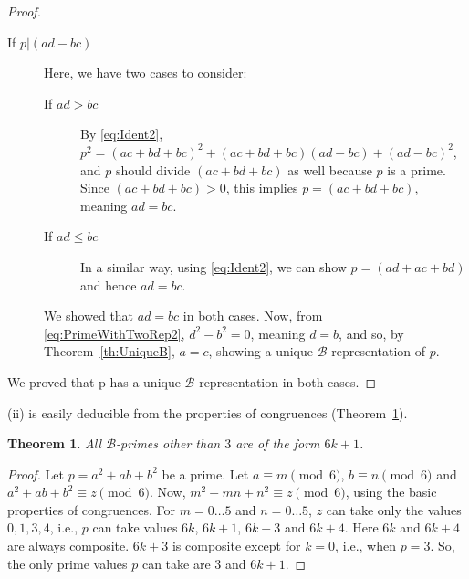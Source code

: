 \documentclass[reqno]{amsart}
\newtheorem{theorem}{Theorem}
\newcommand{\bprime} {\ensuremath{\mathcal B}-prime}
\newcommand{\brep}   {\ensuremath{\mathcal B}-representation}
\newcommand{\congr}[3]{{\ensuremath{{#1} \equiv {#2}
      \pmod{#3}}}}
\newcommand{\bq}[2]{\ensuremath{{#1}^2 + {#1}{#2} + {#2}^2}}
\newcommand{\bqab}{\bq{a}{b}}
\begin{document}
\begin{proof}
\begin{description}
  \item [If \boldmath$p|(ad-bc)$\unboldmath] Here, we have two cases to consider:
    \begin{description}
    \item [If \boldmath$ad > bc$\unboldmath] By \eqref{eq:Ident2}, $p^2 =
      \bq{(ac+bd+bc)}{(ad-bc)}$, and $p$ should divide
      $(ac+bd+bc)$ as well because $p$ is a prime.  Since
      $(ac+bd+bc) > 0$, this implies $p=(ac+bd+bc)$, meaning
      $ad=bc$.  
    \item [If \boldmath$ad \le bc$\unboldmath] In a similar way, using \eqref{eq:Ident2}, we can show $p =
      (ad+ac+bd)$ and hence $ad = bc$.  
    \end{description}
    We showed that $ad=bc$ in both cases.  Now, from
    \eqref{eq:PrimeWithTwoRep2}, $d^2-b^2 = 0$, meaning $d=b$,
    and so, by Theorem~\ref{th:UniqueB}, $a=c$, showing a unique \brep{} of $p$.
  \end{description}
  We proved that p has a unique \brep{} in both cases.
\end{proof}

(ii) is easily deducible from the properties of
congruences (Theorem~\ref{th:Basic}). 

\begin{theorem}
  \label{th:Basic}
  All \bprime{}s other than $3$ are of the form $6k+1$.
\end{theorem}
\begin{proof}
  Let $p = a^2 + ab + b^2$ be a prime.  
  Let \congr{a}{m}{6}, \congr{b}{n}{6} and
  \congr{\bqab}{z}{6}. Now, 
  \congr{\bq{m}{n}}{z}{6}, using the basic properties
  of congruences.
  For $m = 0 \ldots 5$ and $n = 0 \ldots 5$, $z$ can take
  only the values $0, 1, 3, 4$, i.e., $p$ can take values
  $6k$, $6k+1$, $6k+3$ and $6k+4$.  Here $6k$ and $6k+4$ are
  always composite.  $6k+3$ is composite except for $k
  = 0$, i.e., when $p = 3$.  So, the only prime values $p$ can
  take are $3$ and $6k+1$.
\end{proof}
\end{document}

